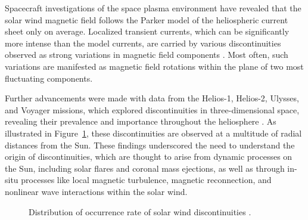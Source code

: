\documentclass[
  letterpaper,
  DIV=11,
  numbers=noendperiod]{scrartcl}
\begin{document}
Spacecraft investigations of the space plasma environment have revealed that the solar wind magnetic field follows the Parker model of the heliospheric current sheet only on average. Localized transient currents, which can be significantly more intense than the model currents, are carried by various discontinuities observed as strong variations in magnetic field components \citep{colburnDiscontinuitiesSolarWind1966, burlagaMicroscaleStructuresInterplanetary1968, turnerOrientationsRotationalTangential1971}. Most often, such variations are manifested as magnetic field rotations within the plane of two most fluctuating components.

Further advancements were made with data from the Helios-1, Helios-2, Ulysses, and Voyager missions, which explored discontinuities in three-dimensional space, revealing their prevalence and importance throughout the heliosphere \citep{marianiStatisticalStudyMagnetohydrodynamic1983, tsurutaniNonlinearElectromagneticWaves1997}. As illustrated in Figure~\ref{fig-1}, these discontinuities are observed at a multitude of radial distances from the Sun. These findings underscored the need to understand the origin of discontinuities, which are thought to arise from dynamic processes on the Sun, including solar flares and coronal mass ejections, as well as through in-situ processes like local magnetic turbulence, magnetic reconnection, and nonlinear wave interactions within the solar wind.

\begin{figure}


\caption{\label{fig-1}Distribution of occurrence rate of solar wind discontinuities \citep{sodingRadialLatitudinalDependencies2001}.}

\end{figure}%
\end{document}
